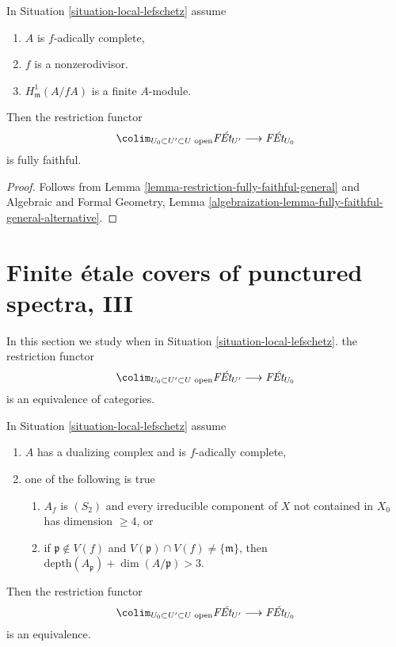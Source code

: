 \begin{lemma}
\label{lemma-fully-faithful-general}
In Situation \ref{situation-local-lefschetz} assume
\begin{enumerate}
\item $A$ is $f$-adically complete,
\item $f$ is a nonzerodivisor.
\item $H^1_\mathfrak m(A/fA)$ is a finite $A$-module.
\end{enumerate}
Then the restriction functor
$$
\colim_{U_0 \subset U' \subset U\text{ open}} \textit{F\'Et}_{U'}
\longrightarrow
\textit{F\'Et}_{U_0}
$$
is fully faithful.
\end{lemma}

\begin{proof}
Follows from
Lemma \ref{lemma-restriction-fully-faithful-general} and
Algebraic and Formal Geometry, Lemma
\ref{algebraization-lemma-fully-faithful-general-alternative}.
\end{proof}








\section{Finite \'etale covers of punctured spectra, III}
\label{section-pi1-punctured-spec-III}

\noindent
In this section we study when in Situation \ref{situation-local-lefschetz}.
the restriction functor
$$
\colim_{U_0 \subset U' \subset U\text{ open}} \textit{F\'Et}_{U'}
\longrightarrow
\textit{F\'Et}_{U_0}
$$
is an equivalence of categories.

\begin{lemma}
\label{lemma-essentially-surjective-general-better}
In Situation \ref{situation-local-lefschetz} assume
\begin{enumerate}
\item $A$ has a dualizing complex and is $f$-adically complete,
\item one of the following is true
\begin{enumerate}
\item $A_f$ is $(S_2)$ and every irreducible component of $X$
not contained in $X_0$ has dimension $\geq 4$, or
\item if $\mathfrak p \not \in V(f)$ and
$V(\mathfrak p) \cap V(f) \not = \{\mathfrak m\}$, then
$\text{depth}(A_\mathfrak p) + \dim(A/\mathfrak p) > 3$.
\end{enumerate}
\end{enumerate}
Then the restriction functor
$$
\colim_{U_0 \subset U' \subset U\text{ open}} \textit{F\'Et}_{U'}
\longrightarrow
\textit{F\'Et}_{U_0}
$$
is an equivalence.
\end{lemma}

